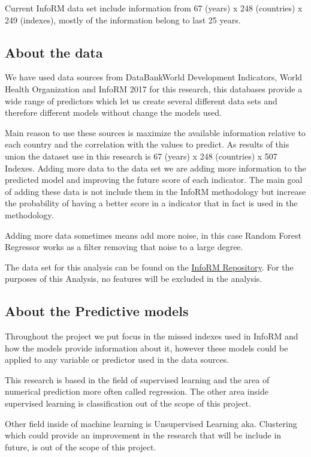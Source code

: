 \documentclass[a4project, twocolumn]{article}
\begin{document}
Current InfoRM data set include information from 67 (years) x 248 (countries) x 249 (indexes), mostly of the information belong to last 25 years.

\subsection{About the data}
We have used data sources from DataBankWorld Development Indicators, World Health Organization and InfoRM 2017 for this research, this databases provide a wide range of predictors which let us create several different data sets and therefore different models without change the models used. 

Main reason to use these sources is maximize the available information relative to each country and the correlation with the values to predict. As results of this union the dataset use in this research is 67 (years) x 248 (countries) x 507 Indexes. Adding more data to the data set we are adding more information to the predicted model and improving the future score of each indicator. The main goal of adding these data is not include them in the InfoRM methodology but increase the probability of having a better score in a indicator that in fact is used in the methodology.

Adding more data sometimes means add more noise, in this case Random Forest Regressor works as a filter removing that noise to a large degree.


The data set for this analysis can be found on the \href{https://TBDs}{InfoRM Repository}. For the purposes of this Analysis, no features will be excluded in the analysis.

\subsection{About the Predictive models}

Throughout the project we put focus in the missed indexes used in InfoRM and how the models provide information about it, however these models could be applied to any variable or predictor used in the data sources.

This research is based in the field of supervised learning and the area of numerical prediction more often called regression. The other area inside supervised learning is classification out of the scope of this project.

Other field inside of machine learning is Unsupervised Learning aka. Clustering which could provide an improvement in the research that will be include in future, is out of the scope of this project.
\end{document}
